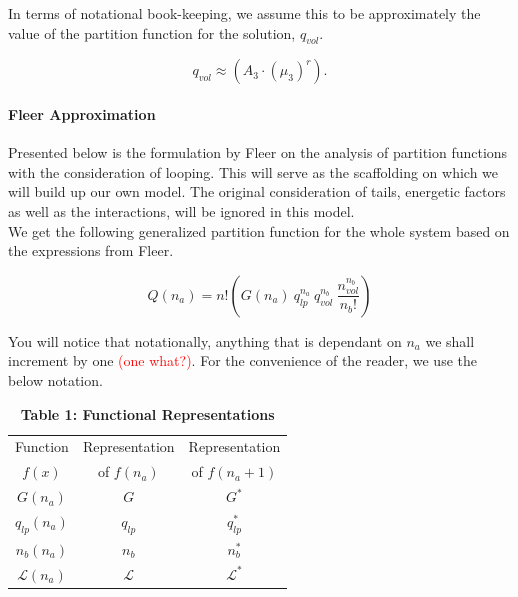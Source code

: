 \documentclass[12pt,letterpaper]{article}
\newcommand{\leng}{\mathcal{L}}
\begin{document}
In terms of notational book-keeping, we assume this to be approximately the value of the partition function for the solution, $q_{vol}$.

\begin{equation}
	    q_{vol}\approx \left(A_3\cdot (\mu_{3})^{r}\right).
	\label{eq. q3}
\end{equation}


\paragraph{Fleer Approximation} Presented below is the formulation by Fleer \cite{fleer1993polymers} on the analysis of partition functions with the consideration of looping. This will serve as the scaffolding on which we will build up our own model. The original consideration of tails, energetic factors as well as the interactions, will be ignored in this model.\\

We get the following generalized partition function for the whole system based on the expressions from Fleer\cite{fleer1993polymers}.

\begin{equation}
	Q(n_a)
	=
	n!
	\left(
	    G(n_a)
	    ~
	    q_{lp}^{n_a}
	    ~
		q_{vol}^{n_{b}}
		~
		\frac{
			n_{vol}^{n_{b}}
		}{
			n_b!
		}
	\right)
	\label{Qfleer1}
\end{equation}


You will notice that notationally, anything that is dependant on $n_a$ we shall increment by one \textcolor{red}{(one what?)}. For the convenience of the reader, we use the below notation.

\begin{table}[H]
\begin{center}
\begin{tabular}{|c|c|c|}
    \hline
    Function  & Representation & Representation\\ $f(x)$ & of $f(n_a)$ & of $f(n_a+1)$  \\
    \hline\hline
    $G(n_a)$ & $G$  &  $G^{*}$\\  
    \hline
    $q_{lp}(n_a)$ & $q_{lp}$  & $q_{lp}^{*}$\\
    \hline    
    $n_b(n_a)$ & $n_b$ & $n_b^{*}$\\
    \hline
    $\leng(n_a)$ & $\leng$ & $\leng^{*}$\\
    \hline
\end{tabular}
\end{center}
\caption*{\textbf{Table 1: Functional Representations}}
\end{table}
\end{document}
